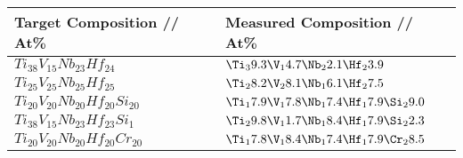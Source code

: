 \begin{tabular}{ll}
\toprule
Target Composition // At\% &              Measured Composition // At\% \\
\midrule
     $Ti_38V_15Nb_23Hf_24$ &         $\Ti_39.3\V_14.7\Nb_22.1\Hf_23.9$ \\
     $Ti_25V_25Nb_25Hf_25$ &         $\Ti_28.2\V_28.1\Nb_16.1\Hf_27.5$ \\
$Ti_20V_20Nb_20Hf_20Si_20$ & $\Ti_17.9\V_17.8\Nb_17.4\Hf_17.9\Si_29.0$ \\
 $Ti_38V_15Nb_23Hf_23Si_1$ & $\Ti_29.8\V_11.7\Nb_18.4\Hf_17.9\Si_22.3$ \\
$Ti_20V_20Nb_20Hf_20Cr_20$ & $\Ti_17.8\V_18.4\Nb_17.4\Hf_17.9\Cr_28.5$ \\
\bottomrule
\end{tabular}
